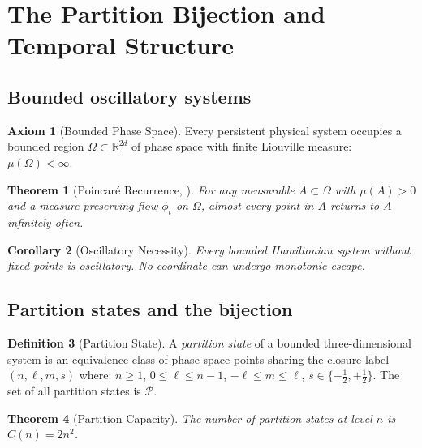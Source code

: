 \documentclass[twocolumn,10pt,a4paper]{article}
\theoremstyle{thmstyle}
\newtheorem{theorem}{Theorem}[section]
\newtheorem{corollary}[theorem]{Corollary}
\theoremstyle{definition}
\newtheorem{definition}[theorem]{Definition}
\newtheorem{axiom}{Axiom}
\theoremstyle{remark}
\newcommand{\R}{\mathbb{R}}
\newcommand{\Parts}{\mathcal{P}}
\begin{document}
\section{The Partition Bijection and Temporal Structure}
\label{sec:foundations}

\subsection{Bounded oscillatory systems}

\begin{axiom}[Bounded Phase Space]
\label{ax:bps}
Every persistent physical system occupies a bounded region
$\Omega \subset \R^{2d}$ of phase space with finite Liouville measure:
$\mu(\Omega) < \infty$.
\end{axiom}

\begin{theorem}[Poincar{\'e} Recurrence, \citealp{poincare1890}]
For any measurable $A \subset \Omega$ with $\mu(A) > 0$ and a
measure-preserving flow $\phi_t$ on $\Omega$, almost every point in $A$
returns to $A$ infinitely often.
\end{theorem}

\begin{corollary}[Oscillatory Necessity]
Every bounded Hamiltonian system without fixed points is oscillatory.
No coordinate can undergo monotonic escape.
\end{corollary}

\subsection{Partition states and the bijection}

\begin{definition}[Partition State]
A \emph{partition state} of a bounded three-dimensional system is an
equivalence class of phase-space points sharing the closure label
$(n, \ell, m, s)$ where:
$n \geq 1$, $0 \leq \ell \leq n-1$, $-\ell \leq m \leq \ell$,
$s \in \{-\tfrac{1}{2},+\tfrac{1}{2}\}$.
The set of all partition states is $\Parts$.
\end{definition}

\begin{theorem}[Partition Capacity]
The number of partition states at level $n$ is $C(n) = 2n^2$.
\end{theorem}
\end{document}
